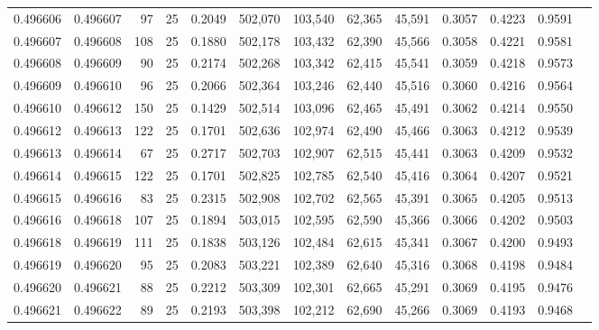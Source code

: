 \begin{tabular}{rrrrrrrrrrrrr}
0.496606 & 0.496607 &    97 &  25 &                                     0.2049 & 502,070 & 103,540 &  62,365 &  45,591 & 0.3057 & 0.4223 & 0.9591 \\
0.496607 & 0.496608 &   108 &  25 &                                     0.1880 & 502,178 & 103,432 &  62,390 &  45,566 & 0.3058 & 0.4221 & 0.9581 \\
0.496608 & 0.496609 &    90 &  25 &                                     0.2174 & 502,268 & 103,342 &  62,415 &  45,541 & 0.3059 & 0.4218 & 0.9573 \\
0.496609 & 0.496610 &    96 &  25 &                                     0.2066 & 502,364 & 103,246 &  62,440 &  45,516 & 0.3060 & 0.4216 & 0.9564 \\
0.496610 & 0.496612 &   150 &  25 &                                     0.1429 & 502,514 & 103,096 &  62,465 &  45,491 & 0.3062 & 0.4214 & 0.9550 \\
0.496612 & 0.496613 &   122 &  25 &                                     0.1701 & 502,636 & 102,974 &  62,490 &  45,466 & 0.3063 & 0.4212 & 0.9539 \\
0.496613 & 0.496614 &    67 &  25 &                                     0.2717 & 502,703 & 102,907 &  62,515 &  45,441 & 0.3063 & 0.4209 & 0.9532 \\
0.496614 & 0.496615 &   122 &  25 &                                     0.1701 & 502,825 & 102,785 &  62,540 &  45,416 & 0.3064 & 0.4207 & 0.9521 \\
0.496615 & 0.496616 &    83 &  25 &                                     0.2315 & 502,908 & 102,702 &  62,565 &  45,391 & 0.3065 & 0.4205 & 0.9513 \\
0.496616 & 0.496618 &   107 &  25 &                                     0.1894 & 503,015 & 102,595 &  62,590 &  45,366 & 0.3066 & 0.4202 & 0.9503 \\
0.496618 & 0.496619 &   111 &  25 &                                     0.1838 & 503,126 & 102,484 &  62,615 &  45,341 & 0.3067 & 0.4200 & 0.9493 \\
0.496619 & 0.496620 &    95 &  25 &                                     0.2083 & 503,221 & 102,389 &  62,640 &  45,316 & 0.3068 & 0.4198 & 0.9484 \\
0.496620 & 0.496621 &    88 &  25 &                                     0.2212 & 503,309 & 102,301 &  62,665 &  45,291 & 0.3069 & 0.4195 & 0.9476 \\
0.496621 & 0.496622 &    89 &  25 &                                     0.2193 & 503,398 & 102,212 &  62,690 &  45,266 & 0.3069 & 0.4193 & 0.9468 \\

\end{tabular}

